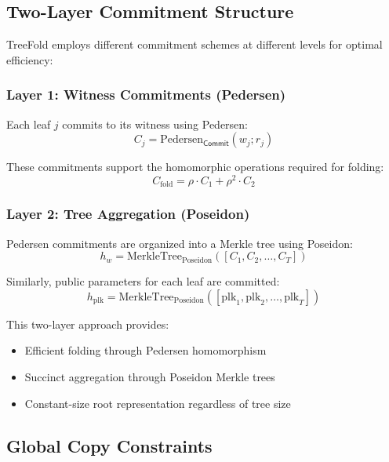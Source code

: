 \documentclass[11pt,a4paper]{article}
\theoremstyle{plain}
\theoremstyle{definition}
\newcommand{\Com}{\mathsf{Commit}}
\begin{document}
\subsection{Two-Layer Commitment Structure}

TreeFold employs different commitment schemes at different levels for optimal efficiency:

\subsubsection{Layer 1: Witness Commitments (Pedersen)}

Each leaf $j$ commits to its witness using Pedersen:
\begin{equation}
C_j = \text{Pedersen}_{\Com}(w_j; r_j)
\end{equation}

These commitments support the homomorphic operations required for folding:
\begin{equation}
C_{\text{fold}} = \rho \cdot C_1 + \rho^2 \cdot C_2
\end{equation}

\subsubsection{Layer 2: Tree Aggregation (Poseidon)}

Pedersen commitments are organized into a Merkle tree using Poseidon:
\begin{equation}
h_w = \text{MerkleTree}_{\text{Poseidon}}([C_1, C_2, \ldots, C_T])
\end{equation}

Similarly, public parameters for each leaf are committed:
\begin{equation}
h_{\text{plk}} = \text{MerkleTree}_{\text{Poseidon}}([\text{plk}_1, \text{plk}_2, \ldots, \text{plk}_T])
\end{equation}

This two-layer approach provides:
\begin{itemize}
\item Efficient folding through Pedersen homomorphism
\item Succinct aggregation through Poseidon Merkle trees
\item Constant-size root representation regardless of tree size
\end{itemize}

\subsection{Global Copy Constraints}
\end{document}
